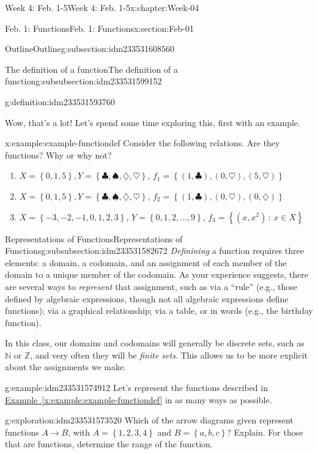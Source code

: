 \documentclass[oneside,10pt,]{book}
\newcommand{\xreffont}{\relax}
\numberwithin{equation}{section}
\newcommand{\set}[1]{\left\{ {#1} \right\}}
\newcommand{\setof}[2]{{\left\{#1\,\colon\,#2\right\}}}
\def\Z{{\mathbb Z}}
\def\N{{\mathbb N}}
\newcommand{\N}{\mathbb N}
\newcommand{\Z}{\mathbb Z}
\begin{document}
\begin{chapterptx}{Week 4: Feb. 1-5}{}{Week 4: Feb. 1-5}{}{}{x:chapter:Week-04}
\begin{sectionptx}{Feb. 1: Functions}{}{Feb. 1: Functions}{}{}{x:section:Feb-01}
\begin{subsectionptx}{Outline}{}{Outline}{}{}{g:subsection:idm233531608560}
\begin{subsubsectionptx}{The definition of a function}{}{The definition of a function}{}{}{g:subsubsection:idm233531599152}
\begin{definition}{}{g:definition:idm233531593760}
\end{definition}
Wow, that's a lot! Let's spend some time exploring this, first with an example.%
\begin{example}{}{x:example:example-functiondef}%
Consider the following relations. Are they functions? Why or why not?%
%
\begin{enumerate}
\item{}\(X=\set{0,1,5}, Y = \set{\clubsuit, \spadesuit, \diamondsuit, \heartsuit}\), \(f_1 = \set{(1,\clubsuit), (0, \heartsuit), (5,\heartsuit)}\)%
\item{}\(X=\set{0,1,5}, Y = \set{\clubsuit, \spadesuit, \diamondsuit, \heartsuit}\), \(f_2 = \set{(1,\clubsuit), (0, \heartsuit), (0,\diamondsuit)}\)%
\item{}\(X = \set{-3,-2,-1,0,1,2,3}\), \(Y = \set{0,1,2,\ldots,9}\), \(f_3 = \setof{(x,x^2)}{x\in X}\)%
\end{enumerate}
\end{example}
\end{subsubsectionptx}
%
%
\typeout{************************************************}
\typeout{************************************************}
%
\begin{subsubsectionptx}{Representations of Functions}{}{Representations of Functions}{}{}{g:subsubsection:idm233531582672}
\emph{Definining} a function requires three elements: a domain, a codomain, and an assignment of each member of the domain to a unique member of the codomain. As your experience suggests, there are several ways to \emph{represent} that assignment, such as via a ``rule'' (e.g., those defined by algebraic expressions, though not all algebraic expressions define functions); via a graphical relationship; via a table, or in words (e.g., the birthday function).%
\par
In this class, our domains and codomains will generally be discrete sets, such as \(\N\) or \(\Z\), and very often they will be \emph{finite sets}. This allows us to be more explicit about the assignments we make.%
\begin{example}{}{g:example:idm233531574912}%
Let's represent the functions described in \hyperref[x:example:example-functiondef]{Example~{\xreffont\ref{x:example:example-functiondef}}} in as many ways as possible.%
\end{example}
\begin{exploration}{}{g:exploration:idm233531573520}%
Which of the arrow diagrams given represent functions \(A\to B\), with \(A = \set{1,2,3,4}\) and \(B = \set{a,b,c}\)? Explain. For those that are functions, determine the range of the function.%

\end{exploration}
\end{subsubsectionptx}
\end{subsectionptx}
\end{sectionptx}
\end{chapterptx}
\end{document}
